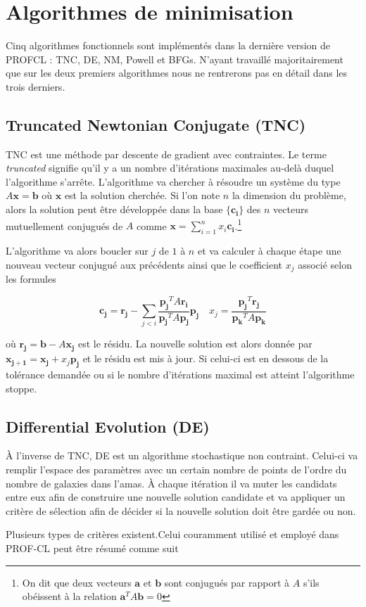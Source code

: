 \documentclass[a4paper,11pt]{article}
\numberwithin{equation}{section}
\begin{document}
    
    
    
    

\newpage
\section{Algorithmes de minimisation}    
\label{sec:Algo}
  Cinq algorithmes fonctionnels sont implémentés dans la dernière version de PROFCL : TNC, DE, NM, Powell et BFGs. N'ayant travaillé majoritairement que sur les deux premiers algorithmes nous ne rentrerons pas en détail dans les trois derniers. 
  \subsection{Truncated Newtonian Conjugate (TNC)}
    TNC est une méthode par descente de gradient avec contraintes. Le terme \textit{truncated} signifie qu'il y a un nombre d'itérations maximales au-delà duquel l'algorithme s'arrête. L'algorithme va chercher à résoudre un système du type $A \bm{x} = \bm{b}$ où $\bm{x}$ est la solution cherchée.
    Si l'on note $n$ la dimension du problème, alors la solution peut être développée dans la base $\lbrace \bm{c_i} \rbrace$ des $n$ vecteurs mutuellement conjugués de $A$ comme $\bm{x} = \sum_{i=1}^n x_i \bm{c_i}$.\footnote{On dit que deux vecteurs $\bm{a}$ et $\bm{b}$ sont conjugués par rapport à $A$ s'ils obéissent à la relation $\bm{a}^T A \bm{b} =0$}\par
    L'algorithme va alors boucler sur $j$ de $1$ à $n$ et va calculer à chaque étape une nouveau vecteur conjugué aux précédents ainsi que le coefficient $x_j$ associé selon les formules\cite{TNC}
    
    \begin{equation}
      \bm{c_j} = \bm{r_j} - \sum_{j<i} \frac{\bm{p_j}^T A \bm{r_i}}{\bm{p_j}^T A \bm{p_j}} \bm{p_j} \quad x_j = \frac{\bm{p_j}^T \bm{r_j}}{\bm{p_k}^T A \bm{p_k}}
    \end{equation}
    
    où $\bm{r_j} = \bm{b} - A\bm{x_j}$ est le résidu. La nouvelle solution est alors donnée par $\bm{x_{j+1}} = \bm{x_j} + x_j \bm{p_j}$ et le résidu est mis à jour. Si celui-ci est en dessous de la tolérance demandée ou si le nombre d'itérations maximal est atteint l'algorithme stoppe.
    
    \subsection{Differential Evolution (DE)}
      À l'inverse de TNC, DE est un algorithme stochastique non contraint\cite{Storn1997}. Celui-ci va remplir l'espace des paramètres avec un certain nombre de points de l'ordre du nombre de galaxies dans l'amas. À chaque itération il va muter les candidats entre eux afin de construire une nouvelle solution candidate et va appliquer un critère de sélection afin de décider si la nouvelle solution doit être gardée ou non.\par
      Plusieurs types de critères existent.Celui couramment utilisé et employé dans PROF-CL peut être résumé comme suit
      
\end{document}
